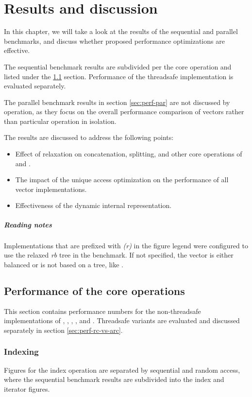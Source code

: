 \newcommand{\relaxed}{\emph{(r)}}

\chapter{Results and discussion}
In this chapter, we will take a look at the results of the sequential and parallel benchmarks, and discuss whether proposed performance optimizations are effective. 

The sequential benchmark results are subdivided per the core operation and listed under the \ref{sec:perf-seq} section. Performance of the threadsafe implementation is evaluated separately.  

The parallel benchmark results in section \ref{sec:perf-par} are not discussed by operation, as they focus on the overall performance comparison of vectors rather than particular operation in isolation. 

The results are discussed to address the following points:
\begin{itemize}
    \item Effect of \rrbtree{} relaxation on concatenation, splitting, and other core operations of \rrbvec{} and \pvec{}. 
    \item The impact of the unique access optimization on the performance of all vector implementations.
    \item Effectiveness of the dynamic internal representation.
\end{itemize}

\paragraph{Reading notes} 
Implementations that are prefixed with \relaxed{} in the figure legend were configured to use the relaxed \emph{rb} tree in the benchmark. If not specified, the vector is either balanced or is not based on a tree, like \stdvec{}. 

\section{Performance of the core operations}
\label{sec:perf-seq}
This section contains performance numbers for the non-threadsafe implementations of \stdvec{}, \rbvec{}, \rrbvec{}, \pvec{}, and \imrsvec{}. Threadsafe variants are evaluated and discussed separately in section \ref{sec:perf-rc-vs-arc}. 

\subsection{Indexing}
Figures for the index operation are separated by sequential and random access, where the sequential benchmark results are subdivided into the index and iterator figures. 

